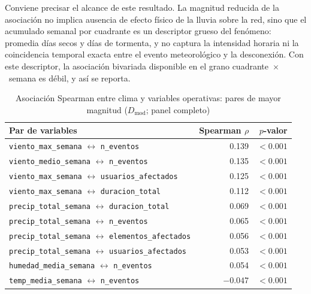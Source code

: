    Conviene precisar el alcance de este resultado. La magnitud reducida de la asociación no implica ausencia de efecto físico de la lluvia sobre la red, sino que el acumulado semanal por cuadrante es un descriptor grueso del fenómeno: promedia días secos y días de tormenta, y no captura la intensidad horaria ni la coincidencia temporal exacta entre el evento meteorológico y la desconexión. Con este descriptor, la asociación bivariada disponible en el grano cuadrante~$\times$~semana es débil, y así se reporta.
    
    
    \begin{table}[!htbp]
    \centering
    \small
    \caption{Asociación Spearman entre clima y variables operativas: pares de mayor magnitud ($D_{\mathrm{mod}}$; panel completo)}
    \label{tab:clima_operativo_cor}
    \begin{tabular}{@{}l r r@{}}
    \toprule
    \textbf{Par de variables} & \textbf{Spearman $\rho$} & \textbf{$p$-valor} \\
    \midrule
    \texttt{viento\_max\_semana} $\leftrightarrow$ \texttt{n\_eventos}            & 0.139 & $< 0{.}001$ \\
    \texttt{viento\_medio\_semana} $\leftrightarrow$ \texttt{n\_eventos}           & 0.135 & $< 0{.}001$ \\
    \texttt{viento\_max\_semana} $\leftrightarrow$ \texttt{usuarios\_afectados}    & 0.125 & $< 0{.}001$ \\
    \texttt{viento\_max\_semana} $\leftrightarrow$ \texttt{duracion\_total}        & 0.112 & $< 0{.}001$ \\
    \texttt{precip\_total\_semana} $\leftrightarrow$ \texttt{duracion\_total}      & 0.069 & $< 0{.}001$ \\
    \texttt{precip\_total\_semana} $\leftrightarrow$ \texttt{n\_eventos}           & 0.065 & $< 0{.}001$ \\
    \texttt{precip\_total\_semana} $\leftrightarrow$ \texttt{elementos\_afectados} & 0.056 & $< 0{.}001$ \\
    \texttt{precip\_total\_semana} $\leftrightarrow$ \texttt{usuarios\_afectados}  & 0.053 & $< 0{.}001$ \\
    \texttt{humedad\_media\_semana} $\leftrightarrow$ \texttt{n\_eventos}          & 0.054 & $< 0{.}001$ \\
    \texttt{temp\_media\_semana} $\leftrightarrow$ \texttt{n\_eventos}             & $-0.047$ & $< 0{.}001$ \\
    \bottomrule
    \end{tabular}
    \end{table}
    
